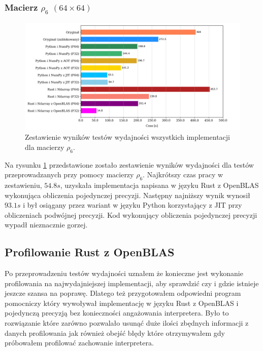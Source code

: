 \documentclass[11pt, a4paper]{article}
\begin{document}
\begin{sloppypar}
    \subsubsection{Macierz \texorpdfstring{$\rho_{6}$ $(64\times64)$}{rho6 64x64}}
    \begin{figure}[ht]
      \centering
      \includegraphics[width=1.0\textwidth]{"resources/rho_6_matrix_comparison.png"}
      \caption{Zestawienie wyników testów wydajności wszystkich implementacji dla macierzy $\rho
      _{6}$.}
      \label{matrix-comparison-rho-6-plot}
    \end{figure}
    Na rysunku \ref{matrix-comparison-rho-6-plot} przedstawione zostało zestawienie
    wyników wydajności dla testów przeprowadzanych przy pomocy macierzy $\rho_{6}$. Najkrótszy
    czas pracy w zestawieniu, $54.8s$, uzyskała implementacja napisana w języku Rust z OpenBLAS
    wykonująca obliczenia pojedynczej precyzji. Następny najniższy wynik wynosił $93.1s$
    i był osiągany przez wariant w języku Python korzystający z JIT przy obliczeniach
    podwójnej precyzji. Kod wykonujący obliczenia pojedynczej precyzji wypadł nieznacznie
    gorzej.

    \FloatBarrier

    \subsection{Profilowanie Rust z OpenBLAS}


    Po przeprowadzeniu testów wydajności uznałem że konieczne jest wykonanie
    profilowania na najwydajniejszej implementacji, aby sprawdzić czy i gdzie istnieje jeszcze
    szansa na poprawę. Dlatego też przygotowałem odpowiedni program pomocniczy który
    wywoływał implementację w języku Rust z OpenBLAS i pojedynczą precyzją bez
    konieczności angażowania interpretera. Było to rozwiązanie które zarówno pozwalało usunąć
    duże ilości zbędnych informacji z danych profilowania jak również obejść błędy które
    otrzymywałem gdy próbowałem profilować zachowanie interpretera.


\end{sloppypar}
\end{document}
